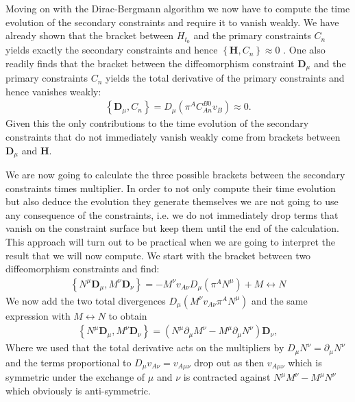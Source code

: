 \documentclass[a4paper,12pt, DIV=14, BCOR=5mm, twoside, headsepline]{scrbook}
\begin{document}
Moving on with the Dirac-Bergmann algorithm we now have to compute the time evolution of the secondary constraints and require it to vanish weakly. We have already shown that the bracket between $H_{t_0}$ and the primary constraints $C_n$ yields exactly the secondary constraints and hence $\left \{\mathbf{H}, C_n \right \} \approx 0$  . One also readily finds that the bracket between the diffeomorphism constraint $\mathbf{D}_{\mu}$ and the primary constraints $C_n$ yields the total derivative of the primary constraints and hence vanishes weakly:
\begin{align}
    \left \{\mathbf{D}_{\mu}, C_n \right \} = D_{\mu} (\pi^A C_{An}^{B0}v_B) \approx 0.
\end{align}
Given this the only contributions to the time evolution of the secondary constraints that do not immediately vanish weakly come from brackets between $\mathbf{D}_{\mu}$ and $\mathbf{H}$. 

We are now going to calculate the three possible brackets between the secondary constraints times multiplier. In order to not only compute their time evolution but also deduce the evolution they generate themselves we are not going to use any consequence of the constraints, i.e. we do not immediately drop terms that vanish on the constraint surface but keep them until the end of the calculation. This approach will turn out to be practical when we are going to interpret the result that we will now compute. We start with the bracket between two diffeomorphism constraints and find:
\begin{align}
    \left \{ N^{\mu}\mathbf{D}_{\mu}, M^{\nu} \mathbf{D}_\nu \right \} =
    -M^{\nu}v_{A\nu}D_{\mu}(\pi^AN^{\mu}) + M \leftrightarrow N  
\end{align}
We now add the two total divergences $D_{\mu}(M^{\nu}v_{A\nu} \pi^A N^{\mu})$ and the same expression with $M \leftrightarrow N$ to obtain
\begin{align}
    \left \{ N^{\mu}\mathbf{D}_{\mu}, M^{\nu} \mathbf{D}_\nu \right \} = (N^\mu \partial_\mu M^\nu - M^\mu \partial_\mu N^\nu) \mathbf{D}_\nu,
\end{align}
Where we used that the total derivative acts on the multipliers by $D_\mu N^{\nu} = \partial_\mu N^\nu$ and the terms proportional to $D_\mu v_{A\nu} = v_{A\mu \nu}$ drop out as then $v_{A\mu \nu}$ which is symmetric under the exchange of $\mu$ and $\nu$ is contracted against $N^\mu M^\nu - M^\mu N^\nu$ which obviously is anti-symmetric. \\
\end{document}
